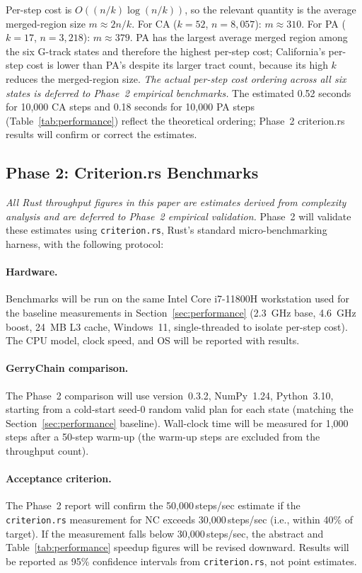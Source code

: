 Per-step cost is $O((n/k)\log(n/k))$, so the relevant quantity is the
average merged-region size $m \approx 2n/k$.
For CA ($k=52$, $n=8{,}057$): $m \approx 310$.
For PA ($k=17$, $n=3{,}218$): $m \approx 379$.
PA has the largest average merged region among the six G-track states
and therefore the highest per-step cost; California's per-step cost
is lower than PA's despite its larger tract count, because its high $k$
reduces the merged-region size.
\emph{The actual per-step cost ordering across all six states is deferred
to Phase~2 empirical benchmarks.}
The estimated 0.52 seconds for 10{,}000 CA steps and 0.18 seconds for
10{,}000 PA steps (Table~\ref{tab:performance}) reflect the theoretical
ordering; Phase~2 criterion.rs results will confirm or correct the
estimates.

\subsection{Phase 2: Criterion.rs Benchmarks}
\label{ssec:phase2}

\emph{All Rust throughput figures in this paper are estimates derived from
complexity analysis and are deferred to Phase~2 empirical validation.}
Phase~2 will validate these estimates using \texttt{criterion.rs}, Rust's
standard micro-benchmarking harness, with the following protocol:

\paragraph{Hardware.}
Benchmarks will be run on the same Intel Core i7-11800H workstation used
for the \gc{} baseline measurements in Section~\ref{sec:performance}
(2.3~GHz base, 4.6~GHz boost, 24~MB L3 cache, Windows~11, single-threaded
to isolate per-step cost).
The CPU model, clock speed, and OS will be reported with results.

\paragraph{GerryChain comparison.}
The Phase~2 comparison will use \gc{} version~0.3.2, NumPy~1.24,
Python~3.10, starting from a cold-start seed-0 random valid plan for
each state (matching the Section~\ref{sec:performance} baseline).
Wall-clock time will be measured for 1{,}000 steps after a 50-step
warm-up (the warm-up steps are excluded from the throughput count).

\paragraph{Acceptance criterion.}
The Phase~2 report will confirm the 50{,}000\,steps/sec estimate if the
\texttt{criterion.rs} measurement for NC exceeds 30{,}000\,steps/sec
(i.e., within 40\% of target).
If the measurement falls below 30{,}000\,steps/sec, the abstract and
Table~\ref{tab:performance} speedup figures will be revised downward.
Results will be reported as 95\% confidence intervals from
\texttt{criterion.rs}, not point estimates.

